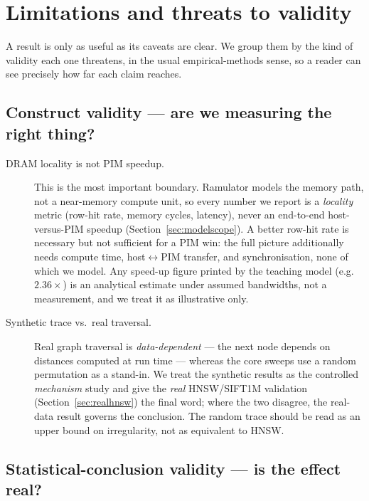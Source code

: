 \documentclass[11pt,a4paper]{article}
\begin{document}
\section{Limitations and threats to validity}
\label{sec:limits}

A result is only as useful as its caveats are clear. We group them by the kind of validity each one
threatens, in the usual empirical-methods sense, so a reader can see precisely how far each claim
reaches.

\subsection{Construct validity --- are we measuring the right thing?}

\begin{description}
\item[DRAM locality is not PIM speedup.] This is the most important boundary. Ramulator models the
memory path, not a near-memory compute unit, so every number we report is a \emph{locality} metric
(row-hit rate, memory cycles, latency), never an end-to-end host-versus-PIM speedup
(Section~\ref{sec:modelscope}). A better row-hit rate is necessary but not sufficient for a PIM win:
the full picture additionally needs compute time, host$\leftrightarrow$PIM transfer, and
synchronisation, none of which we model. Any speed-up figure printed by the teaching model
(e.g.\ $2.36\times$) is an analytical estimate under assumed bandwidths, not a measurement, and we
treat it as illustrative only.
\item[Synthetic trace vs.\ real traversal.] Real graph traversal is \emph{data-dependent} --- the next
node depends on distances computed at run time --- whereas the core sweeps use a random permutation as
a stand-in. We treat the synthetic results as the controlled \emph{mechanism} study and give the
\emph{real} HNSW/SIFT1M validation (Section~\ref{sec:realhnsw}) the final word; where the two
disagree, the real-data result governs the conclusion. The random trace should be read as an upper
bound on irregularity, not as equivalent to HNSW.
\end{description}

\subsection{Statistical-conclusion validity --- is the effect real?}
\end{document}
